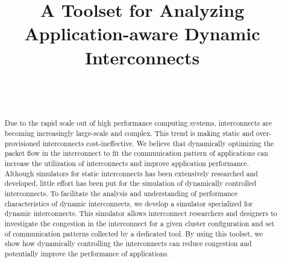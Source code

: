 \documentclass[conference]{IEEEtran}
\begin{document}
\title{A Toolset for Analyzing Application-aware Dynamic Interconnects}

\author{%
     \\
     \\
}

\maketitle

\begin{abstract}
    Due to the rapid scale out of high performance computing systems,
    interconnects are becoming increasingly large-scale and complex. This
    trend is making static and over-provisioned interconnects
    cost-ineffective. We believe that dynamically optimizing the packet flow
    in the interconnect to fit the communication pattern of applications can
    increase the utilization of interconnects and improve application
    performance. Although simulators for static interconnects has been
    extensively researched and developed, little effort has been put for the
    simulation of dynamically controlled interconnects. To facilitate the
    analysis and understanding of performance characteristics of dynamic
    interconnects, we develop a simulator specialized for dynamic
    interconnects. This simulator allows interconnect researchers and
    designers to investigate the congestion in the interconnect for a given
    cluster configuration and set of communication patterns collected by a
    dedicated tool. By using this toolset, we show how dynamically controlling
    the  interconnects can reduce congestion and potentially improve the
    performance of applications.
\end{abstract}
\end{document}
